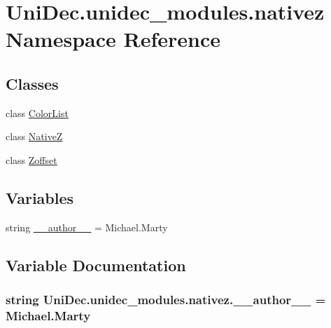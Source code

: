 \hypertarget{namespace_uni_dec_1_1unidec__modules_1_1nativez}{}\section{Uni\+Dec.\+unidec\+\_\+modules.\+nativez Namespace Reference}
\label{namespace_uni_dec_1_1unidec__modules_1_1nativez}
\subsection*{Classes}
\begin{DoxyCompactItemize}
\item 
class \hyperlink{class_uni_dec_1_1unidec__modules_1_1nativez_1_1_color_list}{Color\+List}
\item 
class \hyperlink{class_uni_dec_1_1unidec__modules_1_1nativez_1_1_native_z}{Native\+Z}
\item 
class \hyperlink{class_uni_dec_1_1unidec__modules_1_1nativez_1_1_zoffset}{Zoffset}
\end{DoxyCompactItemize}
\subsection*{Variables}
\begin{DoxyCompactItemize}
\item 
string \hyperlink{namespace_uni_dec_1_1unidec__modules_1_1nativez_a7a097faa5f9061b8b0a2014dc4018b00}{\+\_\+\+\_\+author\+\_\+\+\_\+} = \textquotesingle{}Michael.\+Marty\textquotesingle{}
\end{DoxyCompactItemize}


\subsection{Variable Documentation}
\hypertarget{namespace_uni_dec_1_1unidec__modules_1_1nativez_a7a097faa5f9061b8b0a2014dc4018b00}{}
\subsubsection[{\+\_\+\+\_\+author\+\_\+\+\_\+}]{\setlength{\rightskip}{0pt plus 5cm}string Uni\+Dec.\+unidec\+\_\+modules.\+nativez.\+\_\+\+\_\+author\+\_\+\+\_\+ = \textquotesingle{}Michael.\+Marty\textquotesingle{}}\label{namespace_uni_dec_1_1unidec__modules_1_1nativez_a7a097faa5f9061b8b0a2014dc4018b00}
